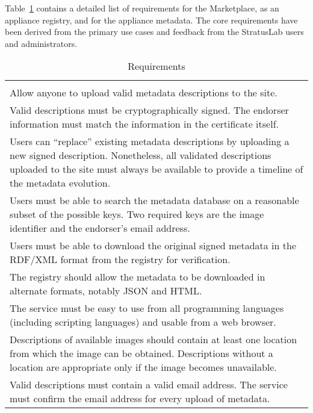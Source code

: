 Table~\ref{tab:requirements} contains a detailed list of requirements
for the Marketplace, as an appliance registry, and for the appliance
metadata.  The core requirements have been derived from the primary
use cases and feedback from the StratusLab users and administrators.

\begin{table}
\caption{Requirements}
\label{tab:requirements}
\begin{center}
\begin{tabular}{p{}}
\hline\hline

\\ Allow anyone to upload valid metadata descriptions to the site.

\\ Valid descriptions must be cryptographically signed.  The endorser
information must match the information in the certificate itself.

\\ Users can ``replace'' existing metadata descriptions by
  uploading a new signed description.  Nonetheless, all validated
  descriptions uploaded to the site must always be available to
  provide a timeline of the metadata evolution.

\\ Users must be able to search the metadata database on a
  reasonable subset of the possible keys.  Two required keys are the
  image identifier and the endorser's email address.

\\ Users must be able to download the original signed metadata in
  the RDF/XML format from the registry for verification.

\\ The registry should allow the metadata to be downloaded in
  alternate formats, notably JSON and HTML.

\\ The service must be easy to use from all programming languages
  (including scripting languages) and usable from a web browser.


\\
  Descriptions of available images should contain at least one
  location from which the image can be obtained.  Descriptions without
  a location are appropriate only if the image becomes unavailable.

\\ Valid descriptions must contain a valid email address.  The
  service must confirm the email address for every upload of metadata.


\end{tabular}
\end{center}
\end{table}
